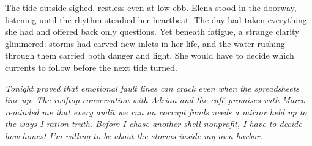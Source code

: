 The tide outside sighed, restless even at low ebb. Elena stood in the doorway, listening until the rhythm steadied her heartbeat. The day had taken everything she had and offered back only questions. Yet beneath fatigue, a strange clarity glimmered: storms had carved new inlets in her life, and the water rushing through them carried both danger and light. She would have to decide which currents to follow before the next tide turned.

\noindent\textit{Tonight proved that emotional fault lines can crack even when the spreadsheets line up. The rooftop conversation with Adrian and the café promises with Marco reminded me that every audit we run on corrupt funds needs a mirror held up to the ways I ration truth. Before I chase another shell nonprofit, I have to decide how honest I'm willing to be about the storms inside my own harbor.}
